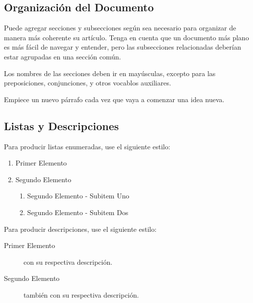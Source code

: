 \documentclass[a4paper,10pt,twocolumn]{article}
\begin{document}
	\subsection{Organización del Documento}\label{sub:results}
		Puede agregar secciones y subsecciones según sea necesario para organizar
		de manera más coherente su artículo. Tenga en cuenta que un documento más
		plano es más fácil de navegar y entender, pero las subsecciones relacionadas
		deberían estar agrupadas en una sección común.

		Los nombres de las secciones deben ir en mayúsculas, excepto para las
		preposiciones, conjunciones, y otros vocablos auxiliares.

		Empiece un nuevo párrafo cada vez que vaya a comenzar una idea nueva.

	\subsection{Listas y Descripciones}\label{sub:lists}
		Para producir listas enumeradas, use el siguiente estilo:

		\begin{enumerate}
			\item Primer Elemento
			\item Segundo Elemento
			\begin {enumerate}
				\item {Segundo Elemento - Subitem Uno}
				\item {Segundo Elemento - Subitem Dos}
			\end {enumerate}
		\end{enumerate}

		Para producir descripciones, use el siguiente estilo:

		\begin{description}
			\item [Primer Elemento] con su respectiva descripción.
			\item [Segundo Elemento] también con su respectiva descripción.
		\end{description}
\end{document}
